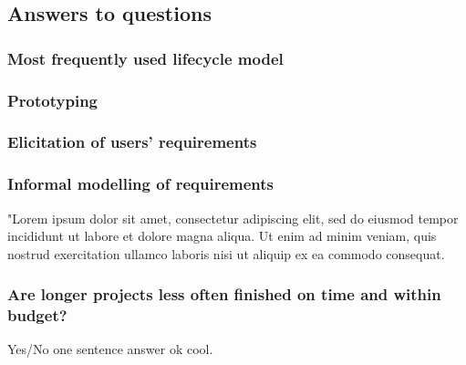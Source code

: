 \documentclass[letterpaper,12pt]{article}
\begin{document}
  \subsection{Answers to questions}
    \subsubsection{Most frequently used lifecycle model}
      \lipsum[66]
    \subsubsection{Prototyping}
      \lipsum[66]
    \subsubsection{Elicitation of users' requirements}
      \lipsum[75]
    \subsubsection{Informal modelling of requirements}
      "Lorem ipsum dolor sit amet, consectetur adipiscing elit, sed do eiusmod tempor incididunt ut labore et dolore magna aliqua. Ut enim ad minim veniam, quis nostrud exercitation ullamco laboris nisi ut aliquip ex ea commodo consequat.
    \subsubsection{Are longer projects less often finished on time and within budget?}
      Yes/No one sentence answer ok cool.
\end{document}
